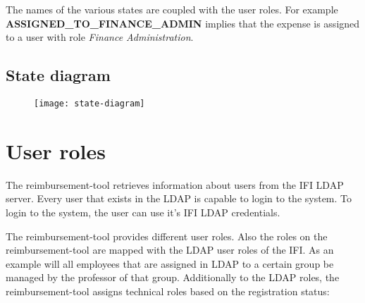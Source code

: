 The names of the various states are coupled with the user roles. For example \textbf{\\ASSIGNED\_TO\_FINANCE\_ADMIN} implies that the expense is assigned to a user with role \textit{Finance Administration}.
\newpage

\subsection{State diagram}
\label{sec:state-diagram}

\begin{figure}[H]
	{\texttt{[image: state-diagram]}}
\end{figure}
\newpage

\section{User roles}
\label{sec:user-roles}

The reimbursement-tool retrieves information about users from the IFI LDAP server. Every user that exists in the LDAP is capable to login to the system. To login to the system, the user can use it's IFI LDAP credentials. \par

The reimbursement-tool provides different user roles. Also the roles on the reimbursement-tool are mapped with the LDAP user roles of the IFI. As an example will all employees that are assigned in LDAP to a certain group be managed by the professor of that group. Additionally to the LDAP roles, the reimbursement-tool assigns technical roles based on the registration status:

